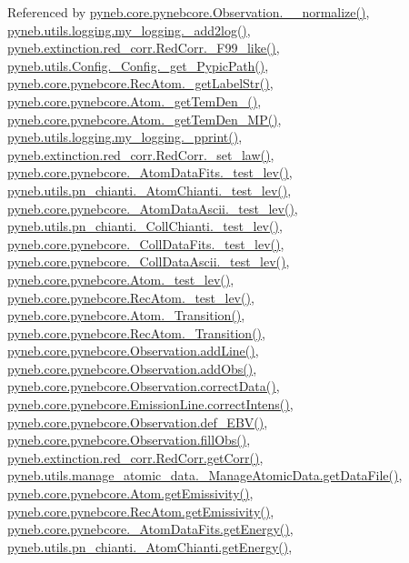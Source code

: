 Referenced by \hyperlink{pynebcore_8py_source_l03885}{pyneb.\+core.\+pynebcore.\+Observation.\+\_\+\+\_\+normalize()}, \hyperlink{logging_8py_source_l00059}{pyneb.\+utils.\+logging.\+my\+\_\+logging.\+\_\+add2log()}, \hyperlink{red__corr_8py_source_l00658}{pyneb.\+extinction.\+red\+\_\+corr.\+Red\+Corr.\+\_\+\+F99\+\_\+like()}, \hyperlink{_config_8py_source_l00086}{pyneb.\+utils.\+Config.\+\_\+\+Config.\+\_\+get\+\_\+\+Pypic\+Path()}, \hyperlink{pynebcore_8py_source_l02854}{pyneb.\+core.\+pynebcore.\+Rec\+Atom.\+\_\+get\+Label\+Str()}, \hyperlink{pynebcore_8py_source_l01803}{pyneb.\+core.\+pynebcore.\+Atom.\+\_\+get\+Tem\+Den\+\_()}, \hyperlink{pynebcore_8py_source_l01980}{pyneb.\+core.\+pynebcore.\+Atom.\+\_\+get\+Tem\+Den\+\_\+\+M\+P()}, \hyperlink{logging_8py_source_l00051}{pyneb.\+utils.\+logging.\+my\+\_\+logging.\+\_\+pprint()}, \hyperlink{red__corr_8py_source_l00176}{pyneb.\+extinction.\+red\+\_\+corr.\+Red\+Corr.\+\_\+set\+\_\+law()}, \hyperlink{pynebcore_8py_source_l00171}{pyneb.\+core.\+pynebcore.\+\_\+\+Atom\+Data\+Fits.\+\_\+test\+\_\+lev()}, \hyperlink{pn__chianti_8py_source_l00284}{pyneb.\+utils.\+pn\+\_\+chianti.\+\_\+\+Atom\+Chianti.\+\_\+test\+\_\+lev()}, \hyperlink{pynebcore_8py_source_l00435}{pyneb.\+core.\+pynebcore.\+\_\+\+Atom\+Data\+Ascii.\+\_\+test\+\_\+lev()}, \hyperlink{pn__chianti_8py_source_l00449}{pyneb.\+utils.\+pn\+\_\+chianti.\+\_\+\+Coll\+Chianti.\+\_\+test\+\_\+lev()}, \hyperlink{pynebcore_8py_source_l00660}{pyneb.\+core.\+pynebcore.\+\_\+\+Coll\+Data\+Fits.\+\_\+test\+\_\+lev()}, \hyperlink{pynebcore_8py_source_l01026}{pyneb.\+core.\+pynebcore.\+\_\+\+Coll\+Data\+Ascii.\+\_\+test\+\_\+lev()}, \hyperlink{pynebcore_8py_source_l01459}{pyneb.\+core.\+pynebcore.\+Atom.\+\_\+test\+\_\+lev()}, \hyperlink{pynebcore_8py_source_l02596}{pyneb.\+core.\+pynebcore.\+Rec\+Atom.\+\_\+test\+\_\+lev()}, \hyperlink{pynebcore_8py_source_l01367}{pyneb.\+core.\+pynebcore.\+Atom.\+\_\+\+Transition()}, \hyperlink{pynebcore_8py_source_l02696}{pyneb.\+core.\+pynebcore.\+Rec\+Atom.\+\_\+\+Transition()}, \hyperlink{pynebcore_8py_source_l03436}{pyneb.\+core.\+pynebcore.\+Observation.\+add\+Line()}, \hyperlink{pynebcore_8py_source_l03467}{pyneb.\+core.\+pynebcore.\+Observation.\+add\+Obs()}, \hyperlink{pynebcore_8py_source_l03906}{pyneb.\+core.\+pynebcore.\+Observation.\+correct\+Data()}, \hyperlink{pynebcore_8py_source_l03325}{pyneb.\+core.\+pynebcore.\+Emission\+Line.\+correct\+Intens()}, \hyperlink{pynebcore_8py_source_l03861}{pyneb.\+core.\+pynebcore.\+Observation.\+def\+\_\+\+E\+B\+V()}, \hyperlink{pynebcore_8py_source_l03452}{pyneb.\+core.\+pynebcore.\+Observation.\+fill\+Obs()}, \hyperlink{red__corr_8py_source_l00211}{pyneb.\+extinction.\+red\+\_\+corr.\+Red\+Corr.\+get\+Corr()}, \hyperlink{manage__atomic__data_8py_source_l00297}{pyneb.\+utils.\+manage\+\_\+atomic\+\_\+data.\+\_\+\+Manage\+Atomic\+Data.\+get\+Data\+File()}, \hyperlink{pynebcore_8py_source_l01716}{pyneb.\+core.\+pynebcore.\+Atom.\+get\+Emissivity()}, \hyperlink{pynebcore_8py_source_l02873}{pyneb.\+core.\+pynebcore.\+Rec\+Atom.\+get\+Emissivity()}, \hyperlink{pynebcore_8py_source_l00268}{pyneb.\+core.\+pynebcore.\+\_\+\+Atom\+Data\+Fits.\+get\+Energy()}, \hyperlink{pn__chianti_8py_source_l00346}{pyneb.\+utils.\+pn\+\_\+chianti.\+\_\+\+Atom\+Chianti.\+get\+Energy()}, 